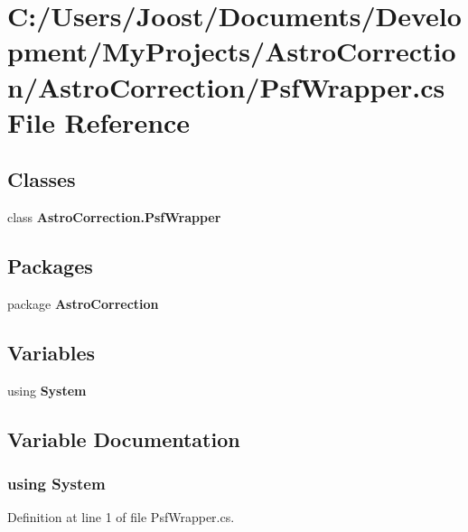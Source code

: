 \section{C:/Users/Joost/Documents/Development/MyProjects/AstroCorrection/AstroCorrection/PsfWrapper.cs File Reference}
\label{_psf_wrapper_8cs}
\subsection*{Classes}
\begin{DoxyCompactItemize}
\item 
class {\bf AstroCorrection.PsfWrapper}
\end{DoxyCompactItemize}
\subsection*{Packages}
\begin{DoxyCompactItemize}
\item 
package {\bf AstroCorrection}
\end{DoxyCompactItemize}
\subsection*{Variables}
\begin{DoxyCompactItemize}
\item 
﻿using {\bf System}
\end{DoxyCompactItemize}


\subsection{Variable Documentation}
\subsubsection[{System}]{\setlength{\rightskip}{0pt plus 5cm}﻿using {\bf System}}\label{_psf_wrapper_8cs_a81a223a02c34d82b47199f08308847f2}


Definition at line 1 of file PsfWrapper.cs.